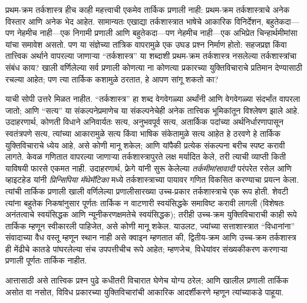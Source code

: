\documentclass[../../../include/open-logic-section]{subfiles}
\begin{document}


प्रथम-क्रम तर्कशास्त्र हीच काही महत्त्वाची एकमेव तार्किक प्रणाली नाही:
प्रथम-क्रम तर्कशास्त्राचे अनेक विस्तार आणि अनेक भेद आहेत. सामान्यतः एखाद्या
तर्कशास्त्रात भाषेचे आकारिक विनिर्देशन, बहुतेकदा---पण नेहमीच नाही---एक
निगामी प्रणाली आणि बहुतेकदा---पण नेहमीच नाही---एक अभिप्रेत चिन्हार्थमीमांसा
यांचा समावेश असतो. पण या संज्ञेच्या तांत्रिक वापरामुळे एक उघड प्रश्न निर्माण
होतो: सहजप्रज्ञ किंवा तात्त्विक अर्थाने वापरल्या जाणाऱ्या ``तर्कशास्त्र'' या
शब्दाशी प्रथम-क्रम तर्कशास्त्र नसलेल्या तर्कशास्त्रांचा संबंध काय? खाली
वर्णिलेल्या सर्व प्रणाली कोणत्या ना कोणत्या प्रकारच्या युक्तिविचाराचे प्रतिमान
देण्यासाठी रचल्या आहेत; पण त्या तार्किक कशामुळे ठरतात, हे आपण सांगू शकतो का?

याची सोपी उत्तरे मिळत नाहीत. ``तर्कशास्त्र'' हा शब्द वेगवेगळ्या अर्थांनी आणि
वेगवेगळ्या संदर्भांत वापरला जातो; आणि ``सत्य'' या संकल्पनेप्रमाणेच या
संकल्पनेचेही अनेक तात्त्विक भूमिकांतून विश्लेषण झाले आहे. उदाहरणार्थ, कोणती
विधाने अनिवार्यतः सत्य, अनुभवपूर्व सत्य, अतार्किक पदांच्या अर्थनिर्धारणापासून
स्वतंत्रपणे सत्य, त्यांच्या आकारामुळे सत्य किंवा भाषिक संकेतामुळे सत्य आहेत
हे ठरवणे हे तार्किक युक्तिविचाराचे ध्येय आहे, असे कोणी मानू शकेल; आणि यांपैकी
प्रत्येक संकल्पना बरीच स्पष्ट करावी लागते. केवळ गणितात वापरल्या जाणाऱ्या
तर्कशास्त्रापुरते लक्ष मर्यादित केले, तरी त्याची व्याप्ती किती याविषयी फारसे
एकमत नाही. उदाहरणार्थ, फ्रेगे यांनी सुरू केलेल्या {\em तर्कमीमांसावादी}
परंपरेत रसेल आणि व्हाइटहेड यांनी \textit{प्रिन्सिपिया मॅथेमॅटिका} मध्ये
तर्कशास्त्राच्या पायावर गणित विकसित करण्याचा प्रयत्न केला. त्यांची तार्किक
प्रणाली खाली वर्णिलेल्या प्रणालीसारख्या उच्च-प्रकार तर्कशास्त्राचे एक रूप
होती. शेवटी त्यांना बहुतेक निकषांनुसार पूर्णतः तार्किक न वाटणारी स्वयंसिद्धके
समाविष्ट करावी लागली (विशेषतः अनंतत्वाचे स्वयंसिद्धक आणि न्यूनीकरणक्षमतेचे
स्वयंसिद्धक); तरीही उच्च-क्रम युक्तिविचाराची काही रूपे तार्किक म्हणून
स्वीकारली पाहिजेत, असे कोणी मानू शकेल. याउलट, ज्यांच्या सत्ताशास्त्रात
``विधानांना'' संवादाच्या वैध वस्तू म्हणून स्थान नाही असे क्वाइन म्हणतात की,
द्वितीय-क्रम आणि उच्च-क्रम तर्कशास्त्र ही मेंढीचे कातडे पांघरलेल्या संच
उपपत्तीचीच रूपे आहेत; म्हणजेच, विधेयांवर संख्यकीकरण करणाऱ्या प्रणाली पूर्णतः
तार्किक नाहीत.

आत्तासाठी असे तात्त्विक प्रश्न पुढे कधीतरी विचारात घेणेच योग्य ठरेल; आणि
खालील प्रणाली तार्किक असोत वा नसोत, विविध प्रकारच्या युक्तिविचारांची आकारिक
आदर्शीकरणे म्हणून त्यांच्याकडे पाहूया.
\end{document}
